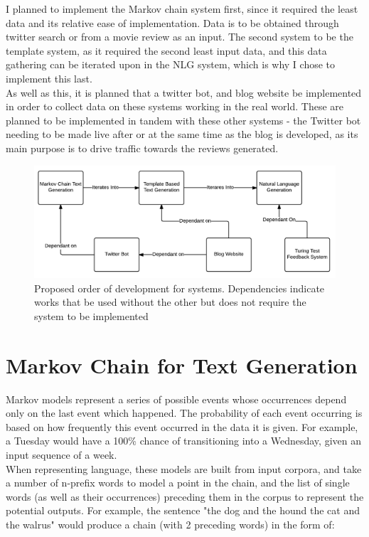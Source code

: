 I planned to implement the Markov chain system first, since it required the least data and its relative ease of implementation. Data is to be obtained through twitter search or from a movie review as an input. The second system to be the template system, as it required the second least input data, and this data gathering can be iterated upon in the NLG system, which is why I chose to implement this last.\\

As well as this, it is planned that a twitter bot, and blog website be implemented in order to collect data on these systems working in the real world. These are planned to be implemented in tandem with these other systems - the Twitter bot needing to be made live after or at the same time as the blog is developed, as its main purpose is to drive traffic towards the reviews generated.\\
\begin{figure}
\centering
\includegraphics[width=0.7\linewidth]{figures/diagrams_etc/system_iterations}
\caption{Proposed order of development for systems. Dependencies indicate works that be used without the other but does not require the system to be implemented}
\label{fig:systemiterations}
\end{figure}

\section{Markov Chain for Text Generation}
Markov models represent a series of possible events whose occurrences depend only on the last event which happened. The probability of each event occurring is based on how frequently this event occurred in the data it is given. For example, a Tuesday would have a 100\% chance of transitioning into a Wednesday, given an input sequence of a week.\\
When representing language, these models are built from input corpora, and take a number of n-prefix words to model a point in the chain, and the list of single words (as well as their occurrences) preceding them in the corpus to represent the potential outputs. For example, the sentence "the dog and the hound the cat and the walrus" would produce a chain (with 2 preceding words) in the form of:


